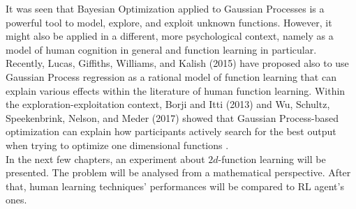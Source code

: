 It was seen that Bayesian Optimization applied to Gaussian Processes is a powerful tool to model, explore, and exploit unknown functions. However, it might also be applied in a different, more psychological context, namely as a model of human cognition in general and function learning in particular. Recently, Lucas, Giffiths, Williams, and Kalish (2015) have proposed also to use Gaussian Process regression as a rational model of function learning that can explain various effects within the literature of human function learning. Within the exploration-exploitation context, Borji and Itti (2013) and Wu, Schultz, Speekenbrink, Nelson, and Meder (2017) showed that Gaussian Process-based optimization can explain how participants actively search for the best output when trying to optimize one dimensional functions \cite{Schulz095190}.\\

In the next few chapters, an experiment about $2d$-function learning will be presented. The problem will be analysed from a mathematical perspective. After that, human learning techniques' performances will be compared to RL agent's ones. 
